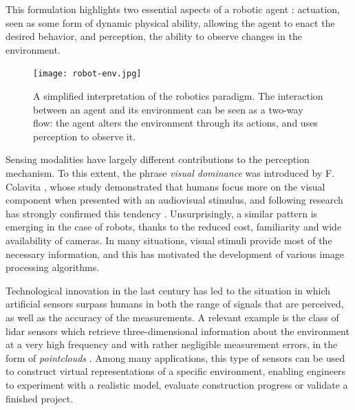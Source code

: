 This formulation highlights two essential aspects of a robotic agent : actuation, seen as some form of dynamic physical ability, allowing the agent to enact the desired behavior, and perception, the ability to observe changes in the environment.


\begin{figure}[H]
    \centering
    \texttt{[image: robot-env.jpg]}
    \caption[Perception in the Robot-Environment exchange]{A simplified interpretation of the robotics paradigm. The interaction between an agent and its environment can be seen as a two-way flow: the agent alters the environment through its actions, and uses perception to observe it.}
    \label{fig:robot-env}
\end{figure}


Sensing modalities have largely different contributions to the perception mechanism. To this extent, the phrase \emph{visual dominance} was introduced by F. Colavita \cite{colavita1974human}, whose study demonstrated that humans focus more on the visual component when presented with an audiovisual stimulus, and following research has strongly confirmed this tendency \cite{Hutmacher2019} \cite{hecht2009sensory}. Unsurprisingly, a similar pattern is emerging in the case of robots, thanks to the reduced cost, familiarity and wide availability of cameras. In many situations, visual stimuli provide most of the necessary information, and this has motivated the development of various image processing algorithms.

Technological innovation in the last century has led to the situation in which artificial sensors surpass humans in both the range of signals that are perceived, as well as the accuracy of the measurements. A relevant example is the class of \acrfull{lidar} sensors which retrieve three-dimensional information about the environment at a very high frequency and with rather negligible measurement errors, in the form of \emph{\glspl{pointcloud}} . Among many applications, this type of sensors can be used to construct virtual representations of a specific environment, enabling engineers to experiment with a realistic model, evaluate construction progress or validate a finished project.


